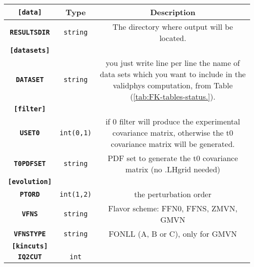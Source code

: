 \begin{table}[H]
\begin{centering}
\begin{tabular}{|c|c|c|}
\hline 
\multicolumn{1}{|c}{\texttt{\textbf{{[}data{]}}}} & \multicolumn{1}{c}{Type} & Description\tabularnewline
\hline 
\hline 
\texttt{\textbf{RESULTSDIR}} & \texttt{string} & %
\begin{minipage}[t]{0.5\columnwidth}%
The directory where output will be located.%
\end{minipage}\tabularnewline
\hline 
\hline 
\texttt{\textbf{{[}datasets{]}}} &  & \tabularnewline
\hline 
\hline 
\texttt{\textbf{DATASET}} & \texttt{string} & %
\begin{minipage}[t]{0.5\columnwidth}%
you just write line per line the name of data sets which you want
to include in the validphys computation, from Table (\ref{tab:FK-tables-status.}).%
\end{minipage}\tabularnewline
\hline
\hline
\texttt{\textbf{{[}filter{]}}} & & \tabularnewline
\hline
\hline
\texttt{\textbf{USET0}} & \texttt{int(0,1)} & %
\begin{minipage}[t]{0.5\columnwidth}%
if 0 filter will produce the experimental covariance matrix, otherwise the t0 covariance matrix will be generated.%
\end{minipage}\tabularnewline
\hline
\texttt{\textbf{T0PDFSET}} & \texttt{string} & %
\begin{minipage}[t]{0.5\columnwidth}%
PDF set to generate the t0 covariance matrix (no .LHgrid needed)%
\end{minipage}\tabularnewline
\hline
\hline
\texttt{\textbf{{[}evolution{]}}} & & \tabularnewline
\hline
\hline
\texttt{\textbf{PTORD}} & \texttt{int(1,2)} & %
\begin{minipage}[t]{0.5\columnwidth}%
the perturbation order%
\end{minipage}\tabularnewline
\hline
\texttt{\textbf{VFNS}} & \texttt{string} & %
\begin{minipage}[t]{0.5\columnwidth}%
Flavor scheme: FFN0, FFNS, ZMVN, GMVN%
\end{minipage}\tabularnewline
\hline
\texttt{\textbf{VFNSTYPE}} & \texttt{string} & %
\begin{minipage}[t]{0.5\columnwidth}%
FONLL (A, B or C), only for GMVN%
\end{minipage}\tabularnewline
\hline
\hline
\texttt{\textbf{{[}kincuts{]}}} & & \tabularnewline
\hline
\hline
\texttt{\textbf{IQ2CUT}} & \texttt{int} & %
\begin{minipage}[t]{0.5\columnwidth}%

\end{minipage}
\end{tabular}
\end{centering}
\end{table}
